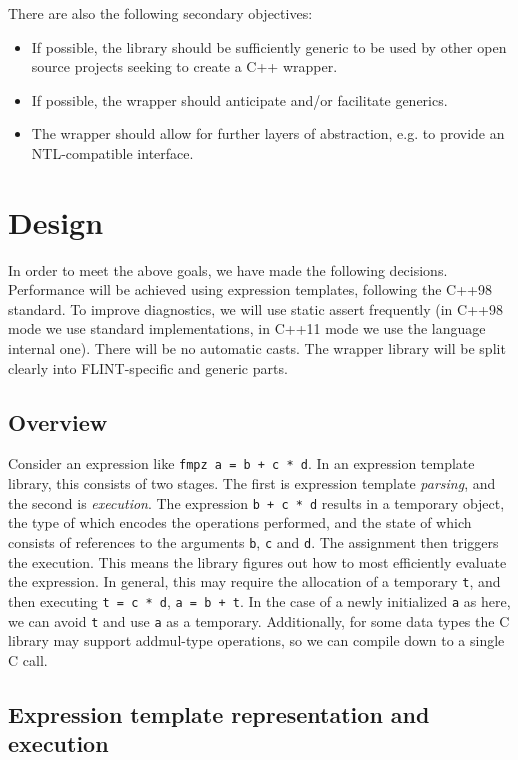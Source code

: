 \documentclass{scrartcl}
\begin{document}
There are also the following secondary objectives:

\begin{itemize}
\item If possible, the library should be sufficiently generic to be used by
    other open source projects seeking to create a C++ wrapper.
\item If possible, the wrapper should anticipate and/or facilitate
    generics.
\item The wrapper should allow for further layers of abstraction, e.g. to
    provide an NTL-compatible interface.
\end{itemize}


\section*{Design}

In order to meet the above goals, we have made the following decisions.
Performance will be achieved using expression templates, following the
C++98 standard. To improve diagnostics, we will use static assert
frequently (in C++98 mode we use standard implementations, in C++11 mode we
use the language internal one). There will be no automatic casts. The
wrapper library will be split clearly into FLINT-specific and generic
parts.

\subsection*{Overview}

Consider an expression like \texttt{fmpz a = b + c * d}. In an expression
template library, this consists of two stages. The first is expression
template \emph{parsing}, and the second is \emph{execution}.
The expression \texttt{b + c
* d} results in a temporary object, the type of which encodes the
operations performed, and the state of which consists of references to the
arguments \texttt{b}, \texttt{c} and \texttt{d}. The assignment then
triggers the execution. This means the library figures out how to most
efficiently evaluate the expression. In general, this may require the
allocation of a temporary \texttt{t}, and then executing \texttt{t = c *
d}, \texttt{a = b + t}. In the case of a newly initialized \texttt{a} as
here, we can avoid \texttt{t} and use \texttt{a} as a temporary.
Additionally, for some data types the C library may support addmul-type
operations, so we can compile down to a single C call.

\subsection*{Expression template representation and execution}
\end{document}

